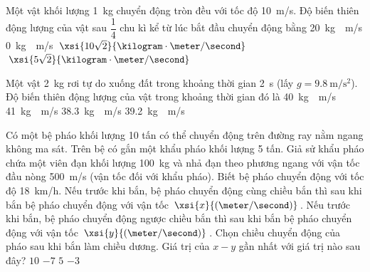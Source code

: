 \begin{ex}
	
	\loigiai{}
\end{ex}
\begin{ex}
	Một vật khối lượng \SI{1}{\kilogram} chuyển động tròn đều với tốc độ \SI{10}{\meter/\second}. Độ biến thiên động lượng của vật sau $\dfrac{1}{4}$ chu kì kể từ lúc bắt đầu chuyển động bằng 
	\choice
	{\SI{20}{\kilogram\cdot\meter/\second}}
	{\SI{0}{\kilogram\cdot\meter/\second}}
	{\True $\xsi{10\sqrt{2}}{\kilogram\cdot\meter/\second}$}
	{$\xsi{5\sqrt{2}}{\kilogram\cdot\meter/\second}$}
	\loigiai{}
\end{ex}
\begin{ex}
	Một vật \SI{2}{\kilogram} rơi tự do xuống đất trong khoảng thời gian \SI{2}{\second} (lấy $g=\SI{9.8}{\meter/\second^2}$). Độ biến thiên động lượng của vật trong khoảng thời gian đó là
	\choice
	{\SI{40}{\kilogram\cdot\meter/\second}}
	{\SI{41}{\kilogram\cdot\meter/\second}}
	{\SI{38.3}{\kilogram\cdot\meter/\second}}
	{\True \SI{39.2}{\kilogram\cdot\meter/\second}}
	\loigiai{}
\end{ex}
\begin{ex}
	Có một bệ pháo khối lượng 10 tấn có thể chuyển động trên đường ray nằm ngang không ma sát. Trên bệ có gắn một khẩu pháo khối lượng 5 tấn. Giả sử khẩu pháo chứa một viên đạn khối lượng \SI{100}{\kilogram} và nhả đạn theo phương ngang với vận tốc đầu nòng \SI{500}{\meter/\second} (vận tốc đối với khẩu pháo). Biết bệ pháo chuyển động với tốc độ \SI{18}{\kilo\meter/\hour}. Nếu trước khi bắn, bệ pháo chuyển động cùng chiều bắn thì sau khi bắn bệ pháo chuyển động với vận tốc $\xsi{x}{(\meter/\second)}$. Nếu trước khi bắn, bệ pháo chuyển động ngược chiều bắn thì sau khi bắn bệ pháo chuyển động với vận tốc $\xsi{y}{(\meter/\second)}$. Chọn chiều chuyển động của pháo sau khi bắn làm chiều dương. Giá trị của $x-y$ gần nhất với giá trị nào sau đây?
	\choice
	{\True $10$}
	{$-7$}
	{$5$}
	{$-3$}
	\loigiai{}
\end{ex}

